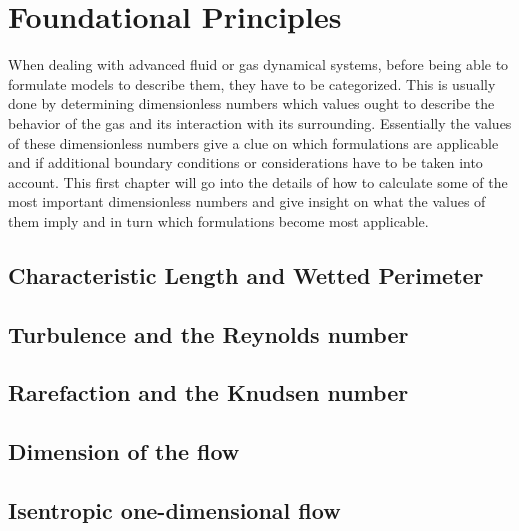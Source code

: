 
\section{Foundational Principles}
	When dealing with advanced fluid or gas dynamical systems, before being able to formulate models to describe them, they have to be categorized.
	This is usually done by determining dimensionless numbers which values ought to describe the behavior of the gas and its interaction with its surrounding.
	Essentially the values of these dimensionless numbers give a clue on which formulations are applicable and if additional boundary conditions or considerations have to be taken into account.
	This first chapter will go into the details of how to calculate some of the most important dimensionless numbers and give insight on what the values of them imply and in turn which formulations become most applicable.

\subsection{Characteristic Length and Wetted Perimeter}\label{sec:characteristic-length}


\subsection{Turbulence and the Reynolds number}


\subsection{Rarefaction and the Knudsen number}


\subsection{Dimension of the flow}\label{sec:flow-dimension-foundations}


\subsection{Isentropic one-dimensional flow}\label{sec:isentropic-1D-foundations}

